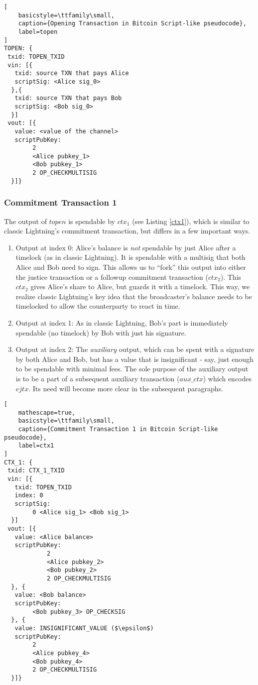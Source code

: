 \begin{lstlisting}[
    basicstyle=\ttfamily\small,
    caption={Opening Transaction in Bitcoin Script-like pseudocode},
    label=topen
]
TOPEN: {
 txid: TOPEN_TXID
 vin: [{
   txid: source TXN that pays Alice
   scriptSig: <Alice sig_0>
  },{     
   txid: source TXN that pays Bob
   scriptSig: <Bob sig_0>
  }]      
 vout: [{
   value: <value of the channel>
   scriptPubKey: 
        2 
        <Alice pubkey_1> 
        <Bob pubkey_1> 
        2 OP_CHECKMULTISIG
  }]}
\end{lstlisting}

\subsubsection{Commitment Transaction 1}
The output of $\mathit{topen}$ is spendable by $\mathit{ctx_1}$ (see Listing \ref{ctx1}), which is similar to classic Lightning's commitment transaction, but differs in a few important ways.
\begin{enumerate}
    \item Output at index 0: Alice's balance is \textit{not} spendable by just Alice after a timelock (as in classic Lightning). It is spendable with a multisig that both Alice and Bob need to sign. This allows us to ``fork'' this output into either the justice transaction or a followup commitment transaction ($\mathit{ctx_2}$). This $\mathit{ctx_2}$ gives Alice's share to Alice, but guards it with a timelock. This way, we realize classic Lightning's key idea that the broadcaster's balance needs to be timelocked to allow the counterparty to react in time.
    \item Output at index 1: As in classic Lightning, Bob's part is immediately spendable (no timelock) by Bob with just his signature.
    \item Output at index 2: The \textit{auxiliary} output, which can be spent with a signature by both Alice and Bob, but has a value that is insignificant - say, just enough to be spendable with minimal fees. The sole purpose of the auxiliary output is to be a part of a subsequent auxiliary transaction ($\mathit{aux\_ctx}$) which encodes $\mathit{ejtx}$. Its need will become more clear in the subsequent paragraphs.
\end{enumerate}

\begin{lstlisting}[
    mathescape=true,
    basicstyle=\ttfamily\small,
    caption={Commitment Transaction 1 in Bitcoin Script-like pseudocode},
    label=ctx1
]
CTX_1: {
 txid: CTX_1_TXID
 vin: [{
   txid: TOPEN_TXID
   index: 0
   scriptSig: 
        0 <Alice sig_1> <Bob sig_1>
  }]
 vout: [{
   value: <Alice balance>
   scriptPubKey:
            2 
            <Alice pubkey_2> 
            <Bob pubkey_2> 
            2 OP_CHECKMULTISIG
  }, {
   value: <Bob balance>
   scriptPubKey: 
        <Bob pubkey_3> OP_CHECKSIG
  }, {
   value: INSIGNIFICANT_VALUE ($\epsilon$)
   scriptPubKey: 
        2 
        <Alice pubkey_4> 
        <Bob pubkey_4> 
        2 OP_CHECKMULTISIG
  }]}
\end{lstlisting}

